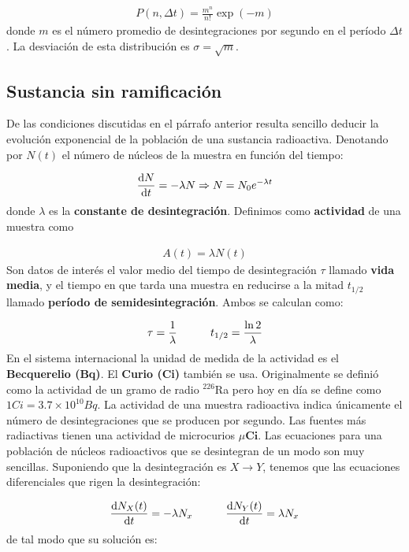 \begin{eqnarray}
	P(n,\Delta t) = \frac{m^n}{n!} \exp (-m)
\end{eqnarray}
donde $m$ es el número promedio de desintegraciones por segundo en el período $\Delta t$. La desviación de esta distribución es $\sigma = \sqrt{m}$.


\subsection{Sustancia sin ramificación} \label{Subsec:02-04-01}

De las condiciones discutidas en el párrafo anterior resulta sencillo deducir la evolución exponencial de la población de una sustancia radioactiva. Denotando por $N(t)$ el número de núcleos de la muestra en función del tiempo:

\begin{eqnarray}
	\frac{\mathrm{d} N}{\mathrm{d} t} = - \lambda N \Rightarrow N = N_0 e^{-\lambda t} 
\end{eqnarray}
donde $\lambda$ es la \textbf{constante de desintegración}. Definimos como \textbf{actividad} de una muestra como

\begin{eqnarray}
	A(t) = \lambda N(t)
\end{eqnarray}
Son datos de interés el valor medio del tiempo de desintegración $\tau$ llamado \textbf{vida media}, y el tiempo en que tarda una muestra en reducirse a la mitad $t_{1/2}$ llamado \textbf{período de semidesintegración}. Ambos se calculan como:

\begin{eqnarray}
	\tau = \frac{1}{\lambda} \quad \quad \quad t_{1/2} = \frac{\ln 2}{\lambda}
\end{eqnarray}
En el sistema internacional la unidad de medida de la actividad es el \textbf{Becquerelio (Bq)}. El \textbf{Curio (Ci)} también se usa. Originalmente se definió como la actividad de un gramo de radio $^{226}$Ra pero hoy en día se define como $1 \unit{Ci} = 3.7 \times 10^{10} \unit{Bq}$. La actividad de una muestra radioactiva indica únicamente el número de desintegraciones que se producen por segundo. Las fuentes más radiactivas tienen una actividad de microcurios $\mu \textbf{Ci}$. Las ecuaciones para una población de núcleos radioactivos que se desintegran de un modo son muy sencillas. Suponiendo que la desintegración es $X\rightarrow Y$, tenemos que las ecuaciones diferenciales que rigen la desintegración:

\begin{eqnarray}
	\frac{\mathrm{d} N_X(t)}{\mathrm{d} t} = - \lambda N_x \quad \quad \quad \frac{\mathrm{d} N_Y(t)}{\mathrm{d} t} = \lambda N_x
\end{eqnarray}
de tal modo que su solución es:

